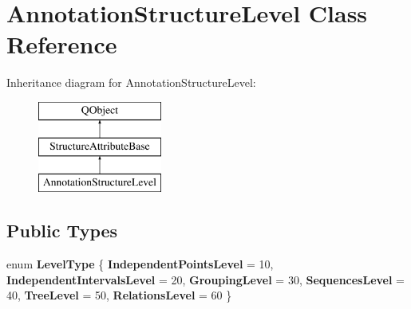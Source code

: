 \hypertarget{class_annotation_structure_level}{}\section{Annotation\+Structure\+Level Class Reference}
\label{class_annotation_structure_level}
Inheritance diagram for Annotation\+Structure\+Level\+:\begin{figure}[H]
\begin{center}
\leavevmode
\includegraphics[height=3.000000cm]{class_annotation_structure_level}
\end{center}
\end{figure}
\subsection*{Public Types}
\begin{DoxyCompactItemize}
\item 
\mbox{\label{class_annotation_structure_level_afc285006c7e5eb38d34b4099893cb7f5}} 
enum {\bfseries Level\+Type} \{ \newline
{\bfseries Independent\+Points\+Level} = 10, 
{\bfseries Independent\+Intervals\+Level} = 20, 
{\bfseries Grouping\+Level} = 30, 
{\bfseries Sequences\+Level} = 40, 
\newline
{\bfseries Tree\+Level} = 50, 
{\bfseries Relations\+Level} = 60
 \}
\end{DoxyCompactItemize}
